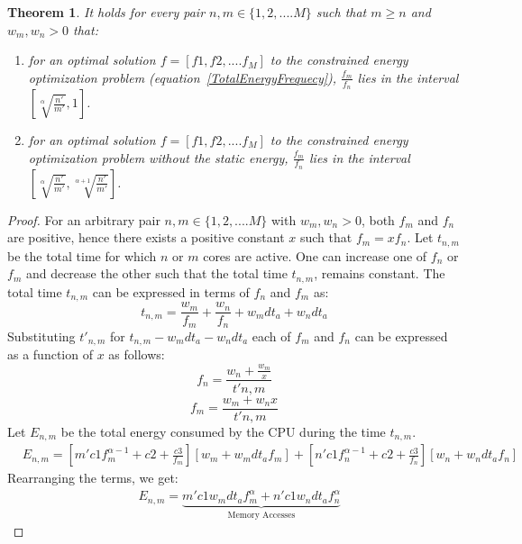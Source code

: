 \documentclass[11pt, letterpaper]{article}
\newtheorem{theorem}{Theorem}
\begin{document}
\begin{theorem}\label{TheoremRange}
It holds for every pair $n,m \in \{1,2,....M\}$ such that $m\geq n$ and $w_m,w_n>0$ that:
 \begin{enumerate}
 \item for an optimal solution $f=[f1,f2,....f_M]$ to the constrained energy optimization problem (equation~\ref{TotalEnergyFrequecy}), $\frac{f_m}{f_n}$ lies in the interval $[\sqrt[\alpha]{\frac{n'}{m'}}, 1]$.
  \item for an optimal solution $f=[f1,f2,....f_M]$ to the constrained energy optimization problem without the static energy,
  $\frac{f_m}{f_n}$ lies in the interval $[\sqrt[\alpha]{\frac{n'}{m'}},\sqrt[\alpha+1]{\frac{n'}{m'}}]$.
 \end{enumerate}
\end{theorem}
\begin{proof}
 For an arbitrary pair $n,m \in \{1,2,....M\}$ with $w_m,w_n>0$, both $f_m$ and $f_n$ are positive, hence there exists a positive constant $x$ such that $f_m = xf_n$.
 Let $t_{n,m}$ be the total time for which $n$ or $m$ cores are active. One can increase one of $f_n$ or $f_m$ and decrease the other such that the total time $t_{n,m}$, remains constant. 
 The total time $t_{n,m}$ can be expressed in terms of $f_n$ and $f_m$ as:
 \begin{displaymath}
  t_{n,m} = \frac{w_m}{f_m} + \frac{w_n}{f_n} + w_mdt_a + w_ndt_a
 \end{displaymath}
Substituting $t'_{n,m}$ for $t_{n,m} - w_mdt_a - w_ndt_a$ each of $f_m$ and $f_n$ can be expressed as a function of $x$ as follows:
\begin{equation}
 f_n = \frac{w_n + \frac{w_m}{x}}{t'{n,m}}
\end{equation}
\begin{equation}
 f_m = \frac{w_m + w_nx}{t'{n,m}}
\end{equation}
Let $E_{n,m}$ be the total energy consumed by the CPU during the time $t_{n,m}$.
\begin{displaymath}
\begin{aligned}
 &E_{n,m} = [m'c1f_m^{\alpha-1} + c2 + \frac{c3}{f_m}][w_m + w_mdt_af_m] 
           + [n'c1f_n^{\alpha-1} + c2 + \frac{c3}{f_n}][w_n + w_ndt_af_n]
\end{aligned}
\end{displaymath}
Rearranging the terms, we get:
\begin{equation}\label{EnergyNMParts}
\begin{aligned}
 &E_{n,m} = \underbrace{m'c1w_mdt_af_m^{\alpha} + n'c1w_ndt_af_n^{\alpha}}_\text{Memory Accesses} 

\end{aligned}
\end{equation}
\end{proof}
\end{document}
